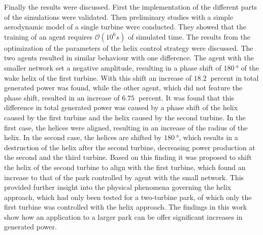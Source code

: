 Finally the results were discussed. First the implementation of the different parts of the simulations were validated. Then preliminary studies with a simple aerodynamic model of a single turbine were conducted. They showed that the training of an agent requires $\mathcal{O}(10^6\si{s})$ of simulated time. The results from the optimization of the parameters of the helix control strategy were discussed. The two agents resulted in similar behaviour with one difference. The agent with the smaller network set a negative amplitude, resulting in a phase shift of $\SI{180}{\degree}$ of the wake helix of the first turbine. With this shift an increase of $\SI{18.2}{}$ percent in total generated power was found, while the other agent, which did not feature the phase shift, resulted in an increase of $\SI{6.75}{}$ percent. It was found that this difference in total generated power was caused by a phase shift of the helix caused by the first turbine and the helix caused by the second turbine. In the first case, the helices were aligned, resulting in an increase of the radius of the helix. In the second case, the helices are shifted by $\SI{180}{\degree}$, which results in a destruction of the helix after the second turbine, decreasing power production at the second and the third turbine. Based on this finding it was proposed to shift the helix of the second turbine to align with the first turbine, which found an increase to that of the park controlled by agent with the small network. This provided further insight into the physical phenomena governing the helix approach, which had only been tested for a two-turbine park, of which only the first turbine was controlled with the helix approach. The findings in this work show how an application to a larger park can be offer significant increases in generated power.  \\
